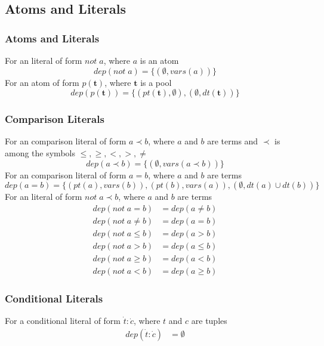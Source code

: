 \documentclass{article}
\newcommand{\pool}[1]{\boldsymbol{#1}}
\newcommand{\tuple}[1]{\dot{#1}}
\newcommand{\set}[1]{\{#1\}}
\newcommand{\dep}[2]{\{(#1), (#2)\}}
\begin{document}
	\subsection{Atoms and Literals}
	\subsubsection{Atoms and Literals}
	For an literal of form $not \; a$, where $a$ is an atom
	\begin{equation*}
		dep(not \; a) = \set{(\emptyset, vars(a))}
	\end{equation*}
	For an atom of form $p(\pool{t})$, where $\pool{t}$ is a pool
	\begin{equation*}
		dep(p(\pool{t})) = \dep{pt(\pool{t}), \emptyset}{\emptyset, dt(\pool{t})}
	\end{equation*}

	\subsubsection{Comparison Literals}
	For an comparison literal of form $a \prec b$, where $a$ and $b$ are terms and $\prec$ is among the symbols $\leq,\ge,<,>,\neq$
	\begin{equation*}
		dep(a \prec b) = \set{(\emptyset, vars(a \prec b))}
	\end{equation*}
	For an comparison literal of form $a = b$, where $a$ and $b$ are terms
	\begin{equation*}
		dep(a = b) = \set{(pt(a), vars(b)), (pt(b), vars(a)), (\emptyset, dt(a) \cup dt(b))}
	\end{equation*}
	For an literal of form $not \; a \prec b$, where $a$ and $b$ are terms
	\begin{align*}
		dep(not \; a = b) &= dep(a \neq b) \\
		dep(not \; a \neq b) &= dep(a = b) \\
		dep(not \; a \leq b) &= dep(a > b) \\
		dep(not \; a > b) &= dep(a \leq b) \\
		dep(not \; a \ge b) &= dep(a < b) \\
		dep(not \; a < b) &= dep(a \ge b)
	\end{align*}

	\subsubsection{Conditional Literals}
	For a conditional literal of form $\tuple{t} : \tuple{c}$, where $t$ and $c$ are tuples
	\begin{align*}
		dep(\tuple{t} : \tuple{c}) &= \emptyset
	\end{align*}
\end{document}
